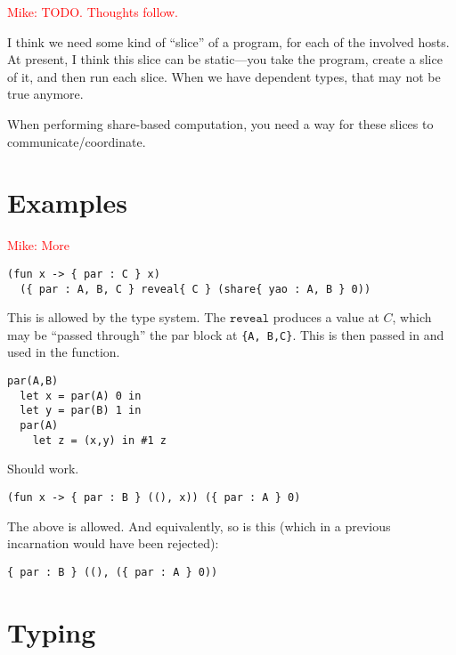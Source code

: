 \documentclass[10pt]{article}
\newcommand{\kw}[1]{\ensuremath{\mathtt{#1}}}
\newcommand{\mwh}[1]{\textcolor{red}{Mike: #1}}
\begin{document}
\mwh{TODO. Thoughts follow.}

I think we need some kind of ``slice'' of a program, for each of the
involved hosts. At present, I think this slice can be static---you
take the program, create a slice of it, and then run each slice. When
we have dependent types, that may not be true anymore.

When performing share-based computation, you need a way for these
slices to communicate/coordinate. 

\section{Examples}

\mwh{More}

\begin{verbatim}
(fun x -> { par : C } x) 
  ({ par : A, B, C } reveal{ C } (share{ yao : A, B } 0))
\end{verbatim}
This is allowed by the type system. The $\kw{reveal}$ produces a value
at $C$, which may be ``passed through'' the par block at \verb+{A, B,C}+. 
This is then passed in and used in the function.

\begin{verbatim}
par(A,B) 
  let x = par(A) 0 in
  let y = par(B) 1 in
  par(A) 
    let z = (x,y) in #1 z
\end{verbatim}
Should work.

\begin{verbatim}
(fun x -> { par : B } ((), x)) ({ par : A } 0)
\end{verbatim}
The above is allowed. And equivalently, so is this (which in a
previous incarnation would have been rejected):
\begin{verbatim}
{ par : B } ((), ({ par : A } 0))
\end{verbatim}

\section{Typing}
\end{document}
